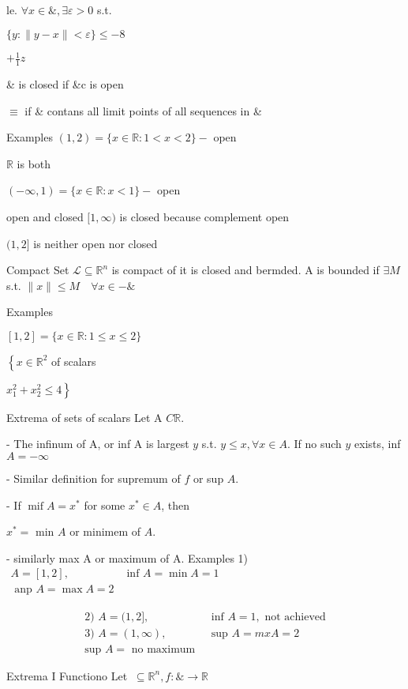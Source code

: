 \documentclass[11pt,a4paper]{article}
\begin{document}
le. $\forall x \in \&, \exists \varepsilon>0$ s.t.

$\{y:\|y-x\|<\varepsilon\} \leq-8$

$+\frac{1}{1} z$

\& is closed if \&c is open

$\equiv$ if \& contans all limit points of all sequences in \&

Examples $(1,2)=\{x \in \mathbb{R}: 1<x<2\}-$ open

$\mathbb{R}$ is both

$(-\infty, 1)=\{x \in \mathbb{R}: x<1\}-$ open

open and closed $[1, \infty)$ is closed because complement open

$(1,2]$ is neither open nor closed

Compact Set $\mathcal{L} \subseteq \mathbb{R}^{n}$ is compact of it is closed and bermded. A is bounded if $\exists M$ s.t. $\|x\| \leqslant M \quad \forall x \in-\&$

Examples

$[1,2]=\{x \in \mathbb{R}: 1 \leqslant x \leqslant 2\}$

$\left\{x \in \mathbb{R}^{2}\right.$
of scalars

$\left.x_{1}^{2}+x_{2}^{2} \leqslant 4\right\}$

Extrema of sets of scalars Let A $C \mathbb{R}$.

- The infinum of A, or inf A is largest $y$ s.t. $y \leqslant x, \forall x \in A$. If no such $y$ exists, inf $A=-\infty$

- Similar definition for supremum of $f$ or sup $A$.

- If $\operatorname{mif} A=x^{*}$ for some $x^{*} \in A$, then

$x^{*}=$ min $A$ or minimem of $A$.

- similarly max A or maximum of A. Examples 1) $\begin{aligned} A=[1,2], & \text { inf } A=\min A=1 \\ \text { anp } A=\max A=2 \end{aligned}$

$$
\begin{array}{ll}
\text { 2) } A=(1,2], & \text { inf } A=1, \text { not achieved } \\
\text { 3) } A=(1, \infty), & \text { sup } A=m x A=2 \\
\text { sup } A=\text { no maximum } &
\end{array}
$$

Extrema I Functiono Let $\ \subseteq \mathbb{R}^{n}, f: \& \rightarrow \mathbb{R}$
\end{document}
